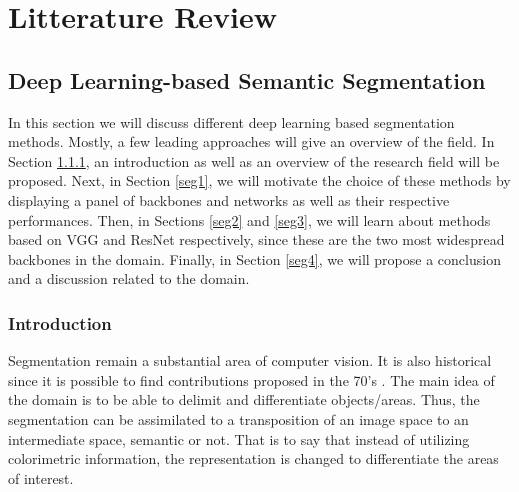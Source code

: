 
\chapter{Litterature Review} %

\label{Chapter2} %





\section{Deep Learning-based Semantic Segmentation}\label{soa-sss}

In this section we will discuss different deep learning based segmentation methods. Mostly, a few leading approaches will give an overview of the field.
In Section \ref{seg-in}, an introduction as well as an overview of the research field will be proposed.
Next, in Section \ref{seg1}, we will motivate the choice of these methods by displaying a panel of backbones and networks as well as their respective performances.
Then, in Sections \ref{seg2} and \ref{seg3}, we will learn about methods based on VGG and ResNet respectively, since these are the two most widespread backbones in the domain.
Finally, in Section \ref{seg4}, we will propose a conclusion and a discussion related to the domain.

\subsection{Introduction}\label{seg-in}

Segmentation remain a substantial area of computer vision. It is also historical since it is possible to find contributions proposed in the 70's \cite{ohta1978analysis}. The main idea of the domain is to be able to delimit and differentiate objects/areas. Thus, the segmentation can be assimilated to a transposition of an image space to an intermediate space, semantic or not. That is to say that instead of utilizing colorimetric information, the representation is changed to differentiate the areas of interest.\\

